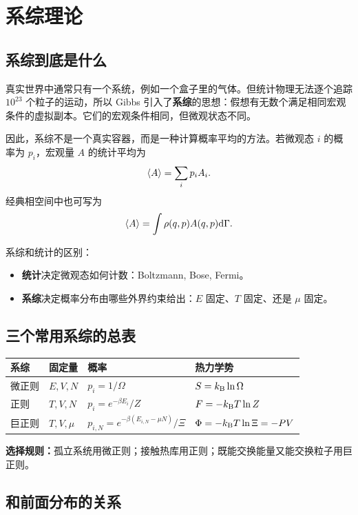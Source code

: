 \chapter{系综理论}

\section{系综到底是什么}

真实世界中通常只有一个系统，例如一个盒子里的气体。但统计物理无法逐个追踪 $10^{23}$ 个粒子的运动，所以 Gibbs 引入了\textbf{系综}的思想：假想有无数个满足相同宏观条件的虚拟副本。它们的宏观条件相同，但微观状态不同。

因此，系综不是一个真实容器，而是一种计算概率平均的方法。若微观态 $i$ 的概率为 $p_i$，宏观量 $A$ 的统计平均为
\[
  \left\langle A \right\rangle=\sum_i p_i A_i.
\]
经典相空间中也可写为
\[
  \left\langle A \right\rangle=\int \rho(q,p)A(q,p)\mathrm{d}\Gamma.
\]

系综和统计的区别：
\begin{itemize}
  \item \textbf{统计}决定微观态如何计数：Boltzmann, Bose, Fermi。
  \item \textbf{系综}决定概率分布由哪些外界约束给出：$E$ 固定、$T$ 固定、还是 $\mu$ 固定。
\end{itemize}

\section{三个常用系综的总表}

\begin{center}
\small
\begin{tabular}{p{} p{} p{} p{}}
\toprule
系综 & 固定量 & 概率 & 热力学势 \\
\midrule
微正则 & $E,V,N$ & $p_i=1/\Omega$ & $S=k_{\mathrm B}\ln\Omega$ \\
正则 & $T,V,N$ & $p_i=e^{-\beta E_i}/Z$ & $F=-k_{\mathrm B} T\ln Z$ \\
巨正则 & $T,V,\mu$ & $p_{i,N}=e^{-\beta(E_{i,N}-\mu N)}/\Xi$ & $\Phi=-k_{\mathrm B} T\ln\Xi=-PV$ \\
\bottomrule
\end{tabular}
\end{center}

\begin{keybox}
\textbf{选择规则：}孤立系统用微正则；接触热库用正则；既能交换能量又能交换粒子用巨正则。
\end{keybox}

\section{和前面分布的关系}

